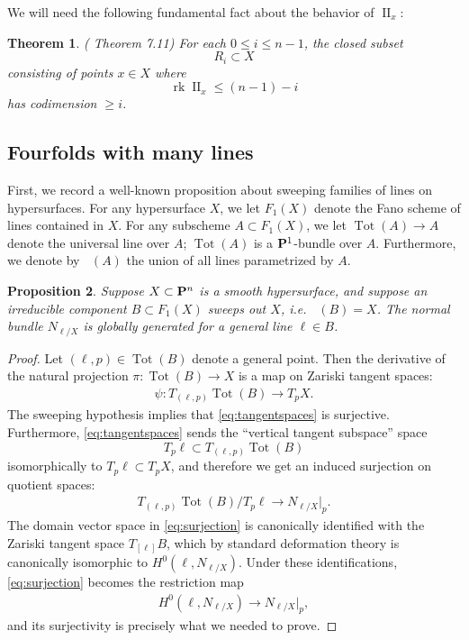 \documentclass[12pt,reqno]{amsart}
\theoremstyle{plain}
\newtheorem{theorem}{Theorem}[section]
\newtheorem{proposition}[theorem]{Proposition}
\theoremstyle{remark}
\numberwithin{equation}{section}
\DeclareMathOperator{\II}{II}
\DeclareMathOperator{\Tot}{Tot}
\DeclareMathOperator{\oTot}{\overline{\Tot}}
\renewcommand{\to}{{\longrightarrow}}
\renewcommand {\P}{{\bf P}}
\providecommand{\rk}{\operatorname{rk}} \declaretheorem[sibling=theorem,style=plain]{remark}
\numberwithin{equation}{section}
\begin{document}
We will need the following fundamental fact about the behavior of
$\II_x$:

\begin{theorem}(\cite{3264} Theorem 7.11)
  \label{theorem:fundamentalform}
  For each $0\leq i \leq n-1$, the closed subset \[R_{i} \subset X\]
  consisting of points $x \in X$ where \[\rk \II_{x} \leq (n-1)-i\] has
  codimension $\geq i$.
\end{theorem}

\subsection{Fourfolds with many lines}
\label{sec:fourfolds-with-many}
 
First, we record a well-known proposition about sweeping families of
lines on hypersurfaces.  For any hypersurface $X$, we let $F_{1}(X)$
denote the Fano scheme of lines contained in $X$. For any subscheme
$A \subset F_{1}(X)$, we let $\Tot(A) \to A$ denote the universal line
over $A$; $\Tot(A)$ is a $\P^{1}$-bundle over $A$. Furthermore, we
denote by $\oTot(A)$ the union of all lines parametrized by $A$.

\begin{proposition}
  \label{proposition:sweeping}
  Suppose $X \subset \P^{n}$ is a smooth hypersurface, and suppose an
  irreducible component $B \subset F_{1}(X)$ sweeps out $X$,
  i.e. $\oTot(B) = X$. The normal bundle $N_{\ell/X}$ is globally
  generated for a general line $\ell \in B$.
\end{proposition}

\begin{proof}
  Let $(\ell,p) \in \Tot(B)$ denote a general point. Then the
  derivative of the natural projection $\pi: \Tot(B) \to X$ is a map
  on Zariski tangent spaces:
  \begin{align}
    \label{eq:tangentspaces}
    \psi: T_{(\ell,p)}\Tot(B) \to T_{p}X.
  \end{align}
  The sweeping hypothesis implies that \eqref{eq:tangentspaces} is
  surjective.  Furthermore, \eqref{eq:tangentspaces} sends the
  ``vertical tangent subspace'' space
  \[T_{p}\ell \subset T_{(\ell,p)}\Tot(B)\] isomorphically to
  $T_{p}\ell \subset T_{p}X$, and therefore we get an induced
  surjection on quotient spaces:
  \begin{align}
    \label{eq:surjection}
    T_{(\ell,p)}\Tot(B)/T_p\ell \to N_{\ell/X}|_{p}.
  \end{align}
  The domain vector space in \eqref{eq:surjection} is canonically
  identified with the Zariski tangent space $T_{[\ell]}B$, which by
  standard deformation theory is canonically isomorphic to
  $H^{0}(\ell, N_{\ell/X})$.  Under these identifications,
  \eqref{eq:surjection} becomes the restriction map
  \begin{align*}
    H^{0}(\ell, N_{\ell/X}) \to N_{\ell/X}|_{p},
  \end{align*}
  and its surjectivity is precisely what we needed to prove.
\end{proof}
\end{document}
